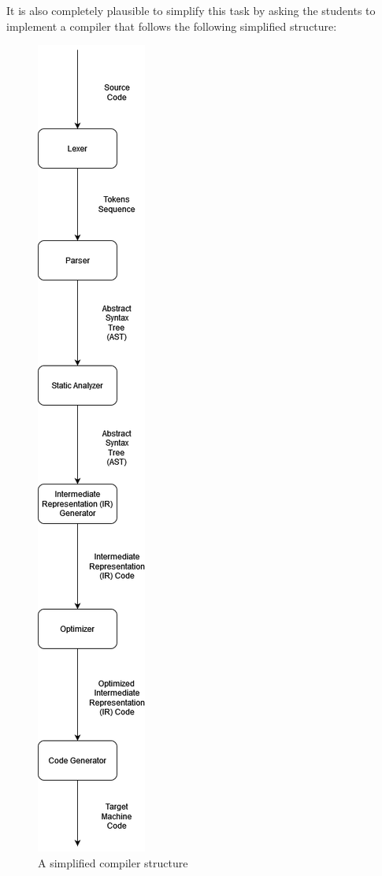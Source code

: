 It is also completely plausible to simplify this task by asking the students to implement a compiler that follows the following simplified structure:

\begin{figure}[H]  
  \centering
  \includegraphics[width=\textwidth, height=0.8\textheight, keepaspectratio]{Figures/Arquiteturas/CompilersSimpliefiedPipeline.png}  
  \caption{A simplified compiler structure}
  \label{fig:Fluxograma}
\end{figure}
    
